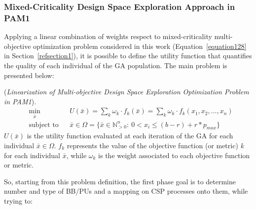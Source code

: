 \subsubsection{Mixed-Criticality Design Space Exploration Approach in PAM1}
%
Applying a linear combination of weights respect to mixed-criticality multi-objective optimization problem considered in this work (Equation~\ref{equation128} in Section~\ref{refsection1}), it is possible to define the utility function that quantifies the quality of each individual of the GA population.
%
The main problem is presented below:
\theoremstyle{definition}
\begin{definition}{(\textit{Linearization of Multi-objective Design Space Exploration Optimization Problem in PAM1}).}
%
%
\begin{equation} \label{equation131}
  \begin{aligned}
    & \underset{\bar x}{\text{min}} &  & U(\bar x) = \sum_{k} \omega_{k} \cdot f_{k}(\bar x) = \sum_{k} \omega_{k} \cdot f_{k}(x_1, x_2, \ldots, x_n)\\
    & \text{subject to}             &  & \bar x \in \Omega = \{ \bar x  \in \mathbb{N}_{> 0}^{n} : \ 0 < x_i \leq (b - r) + r * p_{max} \}
\end{aligned}
\end{equation}
%
$U(\bar x)$ is the utility function evaluated at each iteration of the GA for each individual $\bar x \in \Omega$. \textit{$f_{k}$} represents the value of the objective function (or metric) \textit{k} for each individual \textit{$\bar x$}, while \textit{$\omega_{k}$} is the weight associated to each objective function or metric. 
\end{definition}
So, starting from this problem definition, the first phase goal is to determine number and type of BB/PUs and a mapping on CSP processes onto them, while trying to:
%
